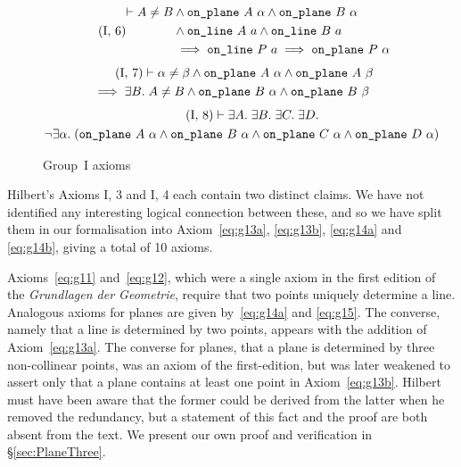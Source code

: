 \begin{figure}
\begin{equation}
  \tag{I,~6}
  \begin{split}
    \vdash A \neq B &\wedge \code{on\_plane}\ A\ \alpha \wedge \code{on\_plane}\ B\ \alpha\\
    &\wedge \code{on\_line}\ A\ a \wedge \code{on\_line}\ B\ a\\
    &\implies \code{on\_line}\ P\ a \implies \code{on\_plane}\ P\ \alpha
  \end{split}
\end{equation}
\begin{multline}
\label{eq:g17}
  \tag{I,~7}
   \vdash\alpha \neq \beta \wedge \texttt{on\_plane}\ A\ \alpha \wedge \texttt{on\_plane}\ A\ \beta\\
   \implies \exists B.\; A \neq B \wedge \texttt{on\_plane}\ B\ \alpha \wedge \texttt{on\_plane}\ B\ \beta
\end{multline}
\begin{multline}  
\label{eq:g18}
  \tag{I,~8}
  \vdash\exists A.\;\exists B.\;\exists C.\;\exists D.\;\\
  \neg \exists \alpha.\; (\texttt{on\_plane}\ A\ \alpha \wedge \texttt{on\_plane}\ B\ \alpha \wedge \texttt{on\_plane}\ C\ \alpha \wedge \texttt{on\_plane}\ D\ \alpha)
\end{multline}
\caption{Group~I axioms}
\label{fig:Group1Axioms}
\end{figure}

Hilbert's Axioms I, 3 and I, 4 each contain two distinct claims. We have not identified any interesting logical connection between these, and so we have split them in our formalisation into Axiom~\ref{eq:g13a}, \ref{eq:g13b}, \ref{eq:g14a} and \ref{eq:g14b}, giving a total of 10 axioms.

Axioms~\ref{eq:g11} and~\ref{eq:g12}, which were a single axiom in the first edition of the \emph{Grundlagen der Geometrie}, require that two points uniquely determine a line. Analogous axioms for planes are given by~\ref{eq:g14a} and \ref{eq:g15}. The converse, namely that a line is determined by two points, appears with the addition of Axiom~\ref{eq:g13a}. The converse for planes, that a plane is determined by three non-collinear points, was an axiom of the first-edition, but was later weakened to assert only that a plane contains at least one point in Axiom~\ref{eq:g13b}. Hilbert must have been aware that the former could be derived from the latter when he removed the redundancy, but a statement of this fact and the proof are both absent from the text. We present our own proof and verification in \S\ref{sec:PlaneThree}.

